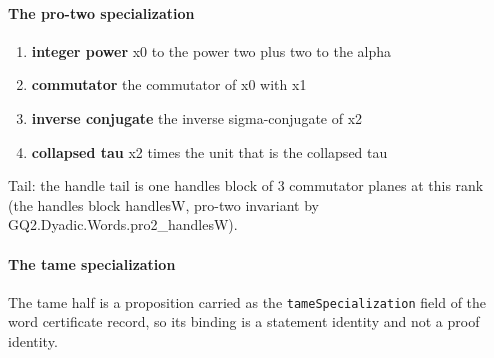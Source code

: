 \paragraph{The pro-two specialization}
\begin{enumerate}
\item[(1)] \textbf{integer power} x0 to the power two plus two to the alpha
\item[(2)] \textbf{commutator} the commutator of x0 with x1
\item[(3)] \textbf{inverse conjugate} the inverse sigma-conjugate of x2
\item[(4)] \textbf{collapsed tau} x2 times the unit that is the collapsed tau
\end{enumerate}
Tail: the handle tail is one handles block of 3 commutator planes at this rank (the handles block handlesW, pro-two invariant by GQ2.Dyadic.Words.pro2\_handlesW).
\paragraph{The tame specialization}
The tame half is a proposition carried as the \texttt{tameSpecialization} field of the word certificate record, so its binding is a statement identity and not a proof identity.
